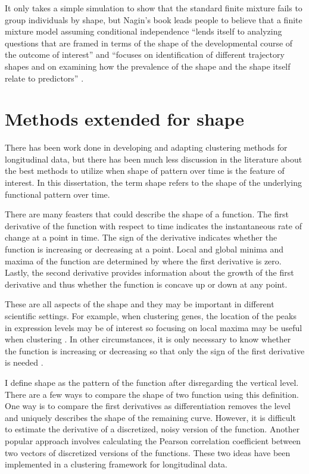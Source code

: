 It only takes a simple simulation to show that the standard finite mixture fails to group individuals by shape, but Nagin's book leads people to believe that a finite mixture model assuming conditional independence ``lends itself to analyzing questions that are framed in terms of the shape of the developmental course of the outcome of interest''  and  ``focuses on identification of different trajectory shapes and on examining how the prevalence of the shape and the shape itself relate to predictors'' \cite{nagin2005}. 


\section{Methods extended for shape}
There has been work done in developing and adapting clustering methods for longitudinal data, but there has been much less discussion in the literature about the best methods to utilize when shape of pattern over time is the feature of interest. In this dissertation, the term shape refers to the shape of the underlying functional pattern over time.

There are many feasters that could describe the shape of a function. The first derivative of the function with respect to time indicates the instantaneous rate of change at a point in time. The sign of the derivative indicates whether the function is increasing or decreasing at a point.  Local and global minima and maxima of the function are determined by where the first derivative is zero. Lastly, the second derivative provides information about the growth of the first derivative and thus whether the function is concave up or down at any point. 

These are all aspects of the shape and they may be important in different scientific settings. For example, when clustering genes, the location of the peaks in expression levels may be of interest so focusing on local maxima may be useful when clustering \cite{luan2003}. In other circumstances, it is only necessary to know whether the function is increasing or decreasing so that only the sign of the first derivative is needed \cite{phang2003}. 

I define shape as the pattern of the function after disregarding the vertical level. There are a few ways to compare the shape of two function using this definition. One way is to compare the first derivatives as differentiation removes the level and uniquely describes the shape of the remaining curve. However, it is difficult to estimate the derivative of a discretized, noisy version of the function. Another popular approach involves calculating the Pearson correlation coefficient between two vectors of discretized versions of the functions. These two ideas have been implemented in a clustering framework for longitudinal data.


